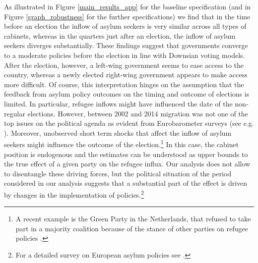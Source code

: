 \documentclass[a4paper,12pt]{article}
\begin{document}
As illustrated in Figure \ref{main_results_app} for the baseline specification (and in Figure \ref{graph_robustness} for the further specifications) we find that in the time before an election the inflow of asylum seekers is very similar across all types of cabinets, whereas in the quarters just after an election, the inflow of asylum seekers diverges substantially. These findings suggest that governments converge to a moderate policies before the election in line with Downsian voting models. After the election, however, a left-wing government seems to ease access to the country, whereas a newly elected right-wing government appears to make access more difficult. Of course, this interpretation hinges on the assumption that the feedback from asylum policy outcomes on the timing and outcome of elections is limited. In particular, refugee inflows might have influenced the date of the non-regular elections. However, between 2002 and 2014 migration was not one of the top issues on the political agenda as evident from Eurobarometer surveys (see e.g. \citet{hatton2017}). Moreover, unobserved short term shocks that affect the inflow of asylum seekers might influence the outcome of the election.\footnote{A recent example is the Green Party in the Netherlands, that refused to take part in a majority coalition because of the stance of other parties on refugee policies \textit{\citep{Economist2017}}.} In this case, the cabinet position is endogenous and the estimates can be understood as upper bounds to the true effect of a given party on the refugee influx. Our analysis does not allow to disentangle these driving forces, but the political situation of the period considered in our analysis suggests that a substantial part of the effect is driven by changes in the implementation of policies.\footnote{For a detailed survey on European asylum policies see \citet{hatton2017}.}


\end{document}
